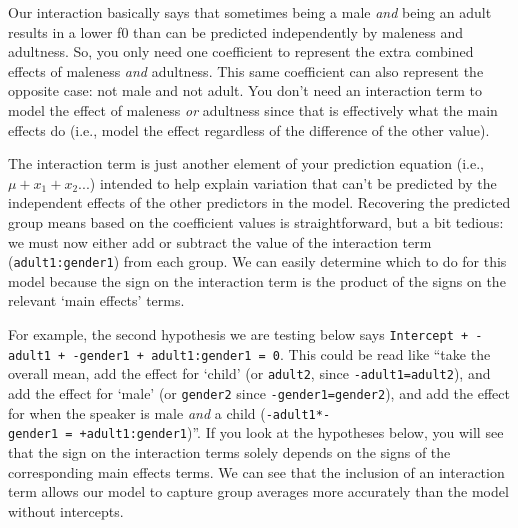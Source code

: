 \documentclass[
]{book}
\begin{document}
Our interaction basically says that sometimes being a male \emph{and} being an adult results in a lower f0 than can be predicted independently by maleness and adultness. So, you only need one coefficient to represent the extra combined effects of maleness \emph{and} adultness. This same coefficient can also represent the opposite case: not male and not adult. You don't need an interaction term to model the effect of maleness \emph{or} adultness since that is effectively what the main effects do (i.e., model the effect regardless of the difference of the other value).

The interaction term is just another element of your prediction equation (i.e., \(\mu + x_1+x_2...\)) intended to help explain variation that can't be predicted by the independent effects of the other predictors in the model. Recovering the predicted group means based on the coefficient values is straightforward, but a bit tedious: we must now either add or subtract the value of the interaction term (\texttt{adult1:gender1}) from each group. We can easily determine which to do for this model because the sign on the interaction term is the product of the signs on the relevant `main effects' terms.

For example, the second hypothesis we are testing below says \texttt{Intercept\ +\ -adult1\ +\ -gender1\ +\ adult1:gender1\ =\ 0}. This could be read like ``take the overall mean, add the effect for `child' (or \texttt{adult2}, since \texttt{-adult1=adult2}), and add the effect for `male' (or \texttt{gender2} since \texttt{-gender1=gender2}), and add the effect for when the speaker is male \emph{and} a child (\texttt{-adult1*-gender1\ =\ +adult1:gender1})''. If you look at the hypotheses below, you will see that the sign on the interaction terms solely depends on the signs of the corresponding main effects terms. We can see that the inclusion of an interaction term allows our model to capture group averages more accurately than the model without intercepts.
\end{document}
